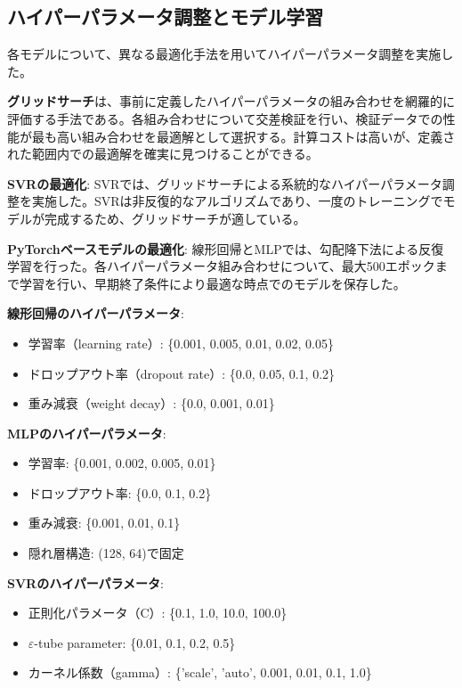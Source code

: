 \documentclass[12pt,a4paper,dvipdfmx]{jsarticle}
\begin{document}
\subsection{ハイパーパラメータ調整とモデル学習}

各モデルについて、異なる最適化手法を用いてハイパーパラメータ調整を実施した。

\textbf{グリッドサーチ}は、事前に定義したハイパーパラメータの組み合わせを網羅的に評価する手法である。各組み合わせについて交差検証を行い、検証データでの性能が最も高い組み合わせを最適解として選択する。計算コストは高いが、定義された範囲内での最適解を確実に見つけることができる。

\textbf{SVRの最適化}: SVRでは、グリッドサーチによる系統的なハイパーパラメータ調整を実施した。SVRは非反復的なアルゴリズムであり、一度のトレーニングでモデルが完成するため、グリッドサーチが適している。

\textbf{PyTorchベースモデルの最適化}: 線形回帰とMLPでは、勾配降下法による反復学習を行った。各ハイパーパラメータ組み合わせについて、最大500エポックまで学習を行い、早期終了条件により最適な時点でのモデルを保存した。

\textbf{線形回帰のハイパーパラメータ}:
\begin{itemize}
    \item 学習率（learning rate）: \{0.001, 0.005, 0.01, 0.02, 0.05\}
    \item ドロップアウト率（dropout rate）: \{0.0, 0.05, 0.1, 0.2\}
    \item 重み減衰（weight decay）: \{0.0, 0.001, 0.01\}
\end{itemize}

\textbf{MLPのハイパーパラメータ}:
\begin{itemize}
    \item 学習率: \{0.001, 0.002, 0.005, 0.01\}
    \item ドロップアウト率: \{0.0, 0.1, 0.2\}
    \item 重み減衰: \{0.001, 0.01, 0.1\}
    \item 隠れ層構造: (128, 64)で固定
\end{itemize}

\textbf{SVRのハイパーパラメータ}:
\begin{itemize}
    \item 正則化パラメータ（C）: \{0.1, 1.0, 10.0, 100.0\}
    \item $\varepsilon$-tube parameter: \{0.01, 0.1, 0.2, 0.5\}
    \item カーネル係数（gamma）: \{'scale', 'auto', 0.001, 0.01, 0.1, 1.0\}
\end{itemize}
\end{document}
